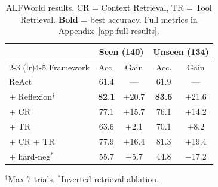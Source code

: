 \begin{table}[t]
\centering
\small
\caption{ALFWorld results. CR = Context Retrieval, TR = Tool Retrieval. \textbf{Bold} = best accuracy. Full metrics in Appendix~\ref{app:full-results}.}
\label{tab:alfworld}
\begin{tabular}{lcccc}
\toprule
 & \multicolumn{2}{c}{\textbf{Seen} (140)} & \multicolumn{2}{c}{\textbf{Unseen} (134)} \\
\cmidrule(lr){2-3} \cmidrule(lr){4-5}
Framework & Acc. & Gain & Acc. & Gain \\
\midrule
ReAct                        & 61.4 & ---    & 61.9 & --- \\
+ Reflexion$^\dagger$        & \textbf{82.1} & $+$20.7 & \textbf{83.6} & $+$21.6 \\
+ CR                         & 77.1 & $+$15.7 & 76.1 & $+$14.2 \\
+ TR                         & 63.6 & $+$2.1  & 70.1 & $+$8.2 \\
+ CR + TR                    & 77.9 & $+$16.4 & 81.3 & $+$19.4 \\
+ hard-neg$^*$               & 55.7 & $-$5.7  & 44.8 & $-$17.2 \\
\bottomrule
\end{tabular}
\vspace{2pt}

{\footnotesize $^\dagger$Max 7 trials. $^*$Inverted retrieval ablation.}
\end{table}
